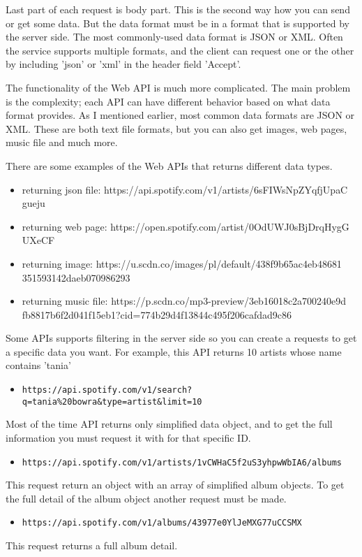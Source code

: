 Last part of each request is body part. This is the second way how you can send or get some data. But the data format must be in a format that is supported by the server side. The most commonly-used data format is JSON or XML. Often the service supports multiple formats, and the client can request one or the other by including 'json' or 'xml' in the header field 'Accept'.

The functionality of the Web API is much more complicated. The main problem is the complexity; each API can have different behavior based on what data format provides. As I mentioned earlier, most common data formats are JSON or XML. These are both text file formats, but you can also get images, web pages, music file and much more.

There are some examples of the Web APIs that returns different data types.

\begin{itemize}

\item returning json file: https://api.spotify.com/v1/artists/6sFIWsNpZYqfjUpaC gueju 
\item returning web page: https://open.spotify.com/artist/0OdUWJ0sBjDrqHygG UXeCF
\item returning image: https://u.scdn.co/images/pl/default/438f9b65ac4eb48681
351593142daeb070986293
\item returning music file: https://p.scdn.co/mp3-preview/3eb16018c2a700240e9d
fb8817b6f2d041f15eb1?cid=774b29d4f13844c495f206cafdad9c86
\end{itemize}


Some APIs supports filtering in the server side so you can create a requests to get a specific data you want. For example, this API returns 10 artists whose name contains 'tania'
\begin{itemize}
\item \nolinkurl{https://api.spotify.com/v1/search?q=tania%20bowra&type=artist&limit=10}
\end{itemize}

Most of the time API returns only simplified data object, and to get the full information you must request it with for that specific ID.
\begin{itemize}
\item \nolinkurl{https://api.spotify.com/v1/artists/1vCWHaC5f2uS3yhpwWbIA6/albums} 
\end{itemize}
This request return an object with an array of simplified album objects. To get the full detail of the album object another request must be made. 
\begin{itemize}
\item \nolinkurl{https://api.spotify.com/v1/albums/43977e0YlJeMXG77uCCSMX}
\end{itemize}
This request returns a full album detail.

